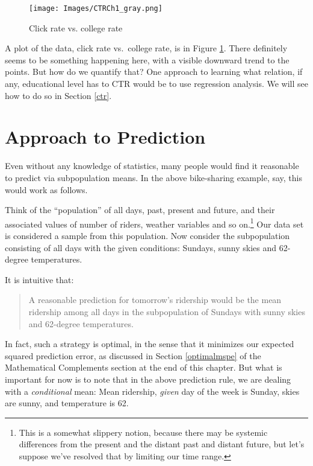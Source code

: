 \begin{figure}
\centerline{
\texttt{[image: Images/CTRCh1\_gray.png]}
}
\caption{Click rate vs. college rate}
\label{ctrch1}
\end{figure}

A plot of the data, click rate vs.\ college rate, is in Figure
\ref{ctrch1}.  There definitely seems to be something happening here,
with a visible downward trend to the points.  But how do we quantify
that?  One approach to learning what relation, if any, educational level
has to CTR would be to use regression analysis.  We will see how to do
so in Section \ref{ctr}.

\section{Approach to Prediction}
\label{regoptimal}

Even without any knowledge of statistics, many people would find it
reasonable to predict via subpopulation means.  In the above
bike-sharing example, say, this would work as follows.

Think of the ``population'' of all days, past, present and future, and
their associated values of number of riders, weather variables and so
on.\footnote{This is a somewhat slippery notion, because there may be
systemic differences from the present and the distant past and distant
future, but let's suppose we've resolved that by limiting our time
range.}  Our data set is considered a sample from this population.
Now consider the subpopulation consisting of all days with the given
conditions:  Sundays, sunny skies and 62-degree temperatures.

It is intuitive that: 

\begin{quote}

A reasonable prediction for tomorrow's ridership would be the mean
ridership among all days in the subpopulation of Sundays with sunny
skies and 62-degree temperatures.

\end{quote}

In fact, such a strategy is optimal, in the sense that it minimizes our
expected squared prediction error, as discussed in Section
\ref{optimalmspe} of the Mathematical Complements section at the end of
this chapter.  But what is important for now is to note that in the above
prediction rule, we are dealing with a \textit{conditional} mean:  Mean
ridership, \textit{given} day of the week is Sunday, skies are sunny,
and temperature is 62.

